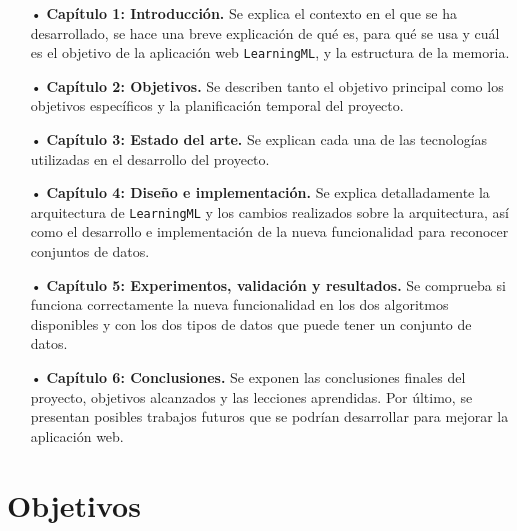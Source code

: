 \documentclass[a4paper, 12pt]{book}
\begin{document}
\begin{itemize}
  \item[•] \textbf{Capítulo 1: Introducción.} Se explica el contexto en el que se ha desarrollado, se hace una breve explicación de qué es, para qué se usa y cuál es el objetivo de la aplicación web \texttt{LearningML}, y la estructura de la memoria.
  
  \item[•] \textbf{Capítulo 2: Objetivos.} Se describen tanto el objetivo principal como los objetivos específicos y la planificación temporal del proyecto.
  
  \item[•] \textbf{Capítulo 3: Estado del arte.} Se explican cada una de las tecnologías utilizadas en el desarrollo del proyecto.
  
  \item[•] \textbf{Capítulo 4: Diseño e implementación.} Se explica detalladamente la arquitectura de \texttt{LearningML} y los cambios realizados sobre la arquitectura, así como el desarrollo e implementación de la nueva funcionalidad para reconocer conjuntos de datos.
  
  \item[•] \textbf{Capítulo 5: Experimentos, validación y resultados.} Se comprueba si funciona correctamente la nueva funcionalidad en los dos algoritmos disponibles y con los dos tipos de datos que puede tener un conjunto de datos.
  
  \item[•] \textbf{Capítulo 6: Conclusiones.} Se exponen las conclusiones finales del proyecto, objetivos alcanzados y las lecciones aprendidas. Por último, se presentan posibles trabajos futuros que se podrían desarrollar para mejorar la aplicación web.
  
\end{itemize}




\cleardoublepage %
\chapter{Objetivos} %
\label{chap:objetivos} %
\end{document}
